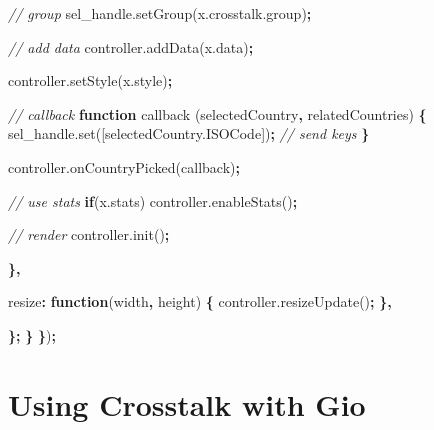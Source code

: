 \documentclass[
]{krantz}
\makeatletter
\newenvironment{Shaded}{\begin{snugshade}}{\end{snugshade}}
\newcommand{\AttributeTok}[1]{\textcolor[rgb]{0.61,0.61,0.61}{#1}}
\newcommand{\CommentTok}[1]{\textcolor[rgb]{0.37,0.37,0.37}{\textit{#1}}}
\newcommand{\ControlFlowTok}[1]{\textcolor[rgb]{0.27,0.27,0.27}{\textbf{#1}}}
\newcommand{\DataTypeTok}[1]{\textcolor[rgb]{0.27,0.27,0.27}{#1}}
\newcommand{\KeywordTok}[1]{\textcolor[rgb]{0.27,0.27,0.27}{\textbf{#1}}}
\newcommand{\NormalTok}[1]{#1}
\newcommand{\OperatorTok}[1]{\textcolor[rgb]{0.43,0.43,0.43}{\textbf{#1}}}
\newcommand{\VariableTok}[1]{\textcolor[rgb]{0,0,0}{#1}}
\newenvironment{kframe}{%
\medskip{}
\setlength{\fboxsep}{.8em}
 \def\at@end@of@kframe{}%
 \ifinner\ifhmode%
  \def\at@end@of@kframe{\end{minipage}}%
  \begin{minipage}{\columnwidth}%
 \fi\fi%
 \def\FrameCommand##1{\hskip\@totalleftmargin \hskip-\fboxsep
 \colorbox{shadecolor}{##1}\hskip-\fboxsep
     \hskip-\linewidth \hskip-\@totalleftmargin \hskip\columnwidth}%
 \MakeFramed {\advance\hsize-\width
   \@totalleftmargin\z@ \linewidth\hsize
   \@setminipage}}%
 {\par\unskip\endMakeFramed%
 \at@end@of@kframe}
\renewenvironment{Shaded}{\begin{kframe}}{\end{kframe}}
\makeatother
\begin{document}
\begin{Shaded}
\begin{Highlighting}[]
        \CommentTok{// group}
        \VariableTok{sel\_handle}\NormalTok{.}\AttributeTok{setGroup}\NormalTok{(}\VariableTok{x}\NormalTok{.}\VariableTok{crosstalk}\NormalTok{.}\AttributeTok{group}\NormalTok{)}\OperatorTok{;}
        
        \CommentTok{// add data}
        \VariableTok{controller}\NormalTok{.}\AttributeTok{addData}\NormalTok{(}\VariableTok{x}\NormalTok{.}\AttributeTok{data}\NormalTok{)}\OperatorTok{;}

        \VariableTok{controller}\NormalTok{.}\AttributeTok{setStyle}\NormalTok{(}\VariableTok{x}\NormalTok{.}\AttributeTok{style}\NormalTok{)}\OperatorTok{;}

        \CommentTok{// callback}
        \KeywordTok{function} \AttributeTok{callback}\NormalTok{ (selectedCountry}\OperatorTok{,}\NormalTok{ relatedCountries) }\OperatorTok{\{}
          \VariableTok{sel\_handle}\NormalTok{.}\AttributeTok{set}\NormalTok{([}\VariableTok{selectedCountry}\NormalTok{.}\AttributeTok{ISOCode}\NormalTok{])}\OperatorTok{;} \CommentTok{// send keys}
        \OperatorTok{\}}

        \VariableTok{controller}\NormalTok{.}\AttributeTok{onCountryPicked}\NormalTok{(callback)}\OperatorTok{;}

        \CommentTok{// use stats}
        \ControlFlowTok{if}\NormalTok{(}\VariableTok{x}\NormalTok{.}\AttributeTok{stats}\NormalTok{)}
          \VariableTok{controller}\NormalTok{.}\AttributeTok{enableStats}\NormalTok{()}\OperatorTok{;}

        \CommentTok{// render}
        \VariableTok{controller}\NormalTok{.}\AttributeTok{init}\NormalTok{()}\OperatorTok{;}

      \OperatorTok{\},}

      \DataTypeTok{resize}\OperatorTok{:} \KeywordTok{function}\NormalTok{(width}\OperatorTok{,}\NormalTok{ height) }\OperatorTok{\{}
        \VariableTok{controller}\NormalTok{.}\AttributeTok{resizeUpdate}\NormalTok{()}\OperatorTok{;}
      \OperatorTok{\},}

    \OperatorTok{\};}
  \OperatorTok{\}}
\OperatorTok{\}}\NormalTok{)}\OperatorTok{;}
\end{Highlighting}
\end{Shaded}

\hypertarget{linking-widgets-using}{%
\section{Using Crosstalk with Gio}\label{linking-widgets-using}}
\end{document}
